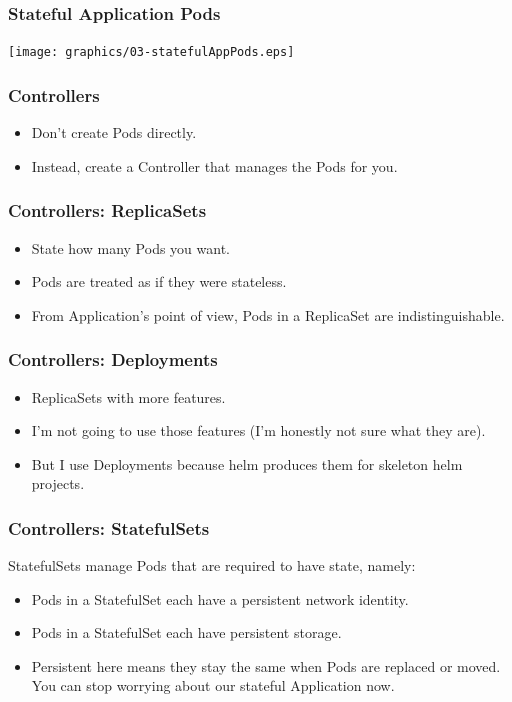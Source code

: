 \documentclass{beamer}
\begin{document}
\begin{frame}
    \frametitle{Stateful Application Pods}
    \texttt{[image: graphics/03-statefulAppPods.eps]}
\end{frame}

\begin{frame}
    \frametitle{Controllers}
    \begin{itemize}
        \item Don't create Pods directly.
        \item Instead, create a Controller that manages the Pods for you.
    \end{itemize}
\end{frame}

\begin{frame}
    \frametitle{Controllers: ReplicaSets}
    \begin{itemize}
        \item State how many Pods you want.
        \item Pods are treated as if they were stateless.
        \item From Application's point of view, Pods in a ReplicaSet are indistinguishable.
    \end{itemize}
\end{frame}

\begin{frame}
    \frametitle{Controllers: Deployments}
    \begin{itemize}
        \item ReplicaSets with more features.
        \item I'm not going to use those features (I'm honestly not sure what they are).
        \item But I use Deployments because helm produces them for skeleton helm projects.
    \end{itemize}
\end{frame}

\begin{frame}
    \frametitle{Controllers: StatefulSets}
    StatefulSets manage Pods that are required to have state, namely:
    \begin{itemize}
        \item Pods in a StatefulSet each have a persistent network identity.
        \item Pods in a StatefulSet each have persistent storage.
        \item Persistent here means they stay the same when Pods are replaced or moved. You can stop worrying about our stateful Application now.
    \end{itemize}
\end{frame}
\end{document}
